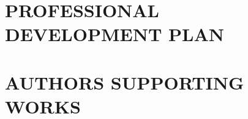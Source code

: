 \documentclass[10pt, english]{article}
\begin{document}
\section{PROFESSIONAL DEVELOPMENT PLAN}

\newpage
\section{AUTHORS SUPPORTING WORKS}

\newpage

\newpage
% 
\printbibliography
\end{document}
